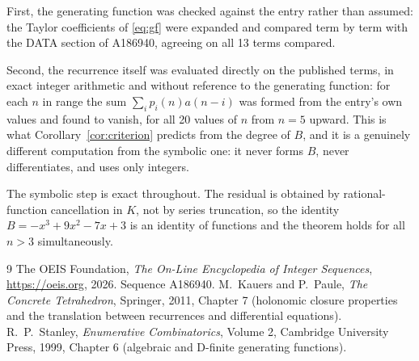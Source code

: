 \documentclass[11pt,a4paper]{article}
\theoremstyle{plain}
\theoremstyle{definition}
\begin{document}
First, the generating function was checked against the entry rather than assumed: the
Taylor coefficients of \eqref{eq:gf} were expanded and compared term by term with the DATA
section of A186940, agreeing on all 13 terms compared.

Second, the recurrence itself was evaluated directly on the published terms, in exact
integer arithmetic and without reference to the generating function: for each $n$ in range
the sum $\sum_{i}p_{i}(n)a(n-i)$ was formed from the entry's own values and found to
vanish, for all 20 values of $n$ from $n=5$ upward. This is what
Corollary~\ref{cor:criterion} predicts from the degree of $B$, and it is a genuinely
different computation from the symbolic one: it never forms $B$, never differentiates, and
uses only integers.

The symbolic step is exact throughout. The residual is obtained by rational-function
cancellation in $K$, not by series truncation, so the identity $B=- x^{3} + 9 x^{2} - 7 x + 3$ is an
identity of functions and the theorem holds for all $n>3$ simultaneously.

\begin{thebibliography}{9}
 The OEIS Foundation, \emph{The On-Line Encyclopedia of Integer Sequences},
\url{https://oeis.org}, 2026. Sequence A186940.
 M.~Kauers and P.~Paule, \emph{The Concrete Tetrahedron}, Springer, 2011,
Chapter 7 (holonomic closure properties and the translation between recurrences and
differential equations).
 R.~P.~Stanley, \emph{Enumerative Combinatorics}, Volume 2, Cambridge
University Press, 1999, Chapter 6 (algebraic and D-finite generating functions).
\end{thebibliography}
\end{document}
